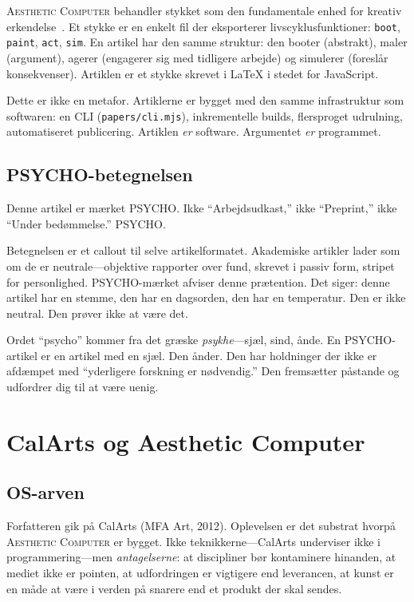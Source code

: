 \documentclass[10pt,letterpaper,twocolumn]{article}
\newcommand{\ac}{\textsc{Aesthetic Computer}}
\begin{document}
\ac{} behandler stykket som den fundamentale enhed for kreativ erkendelse~\citep{scudder2026pieces}. Et stykke er en enkelt fil der eksporterer livscyklusfunktioner: \texttt{boot}, \texttt{paint}, \texttt{act}, \texttt{sim}. En artikel har den samme struktur: den booter (abstrakt), maler (argument), agerer (engagerer sig med tidligere arbejde) og simulerer (foreslår konsekvenser). Artiklen er et stykke skrevet i \LaTeX{} i stedet for JavaScript.

Dette er ikke en metafor. Artiklerne er bygget med den samme infrastruktur som softwaren: en CLI (\texttt{papers/cli.mjs}), inkrementelle builds, flersproget udrulning, automatiseret publicering. Artiklen \emph{er} software. Argumentet \emph{er} programmet.

\subsection{PSYCHO-betegnelsen}

Denne artikel er mærket PSYCHO. Ikke ``Arbejdsudkast,'' ikke ``Preprint,'' ikke ``Under bedømmelse.'' PSYCHO.

Betegnelsen er et callout til selve artikelformatet. Akademiske artikler lader som om de er neutrale---objektive rapporter over fund, skrevet i passiv form, stripet for personlighed. PSYCHO-mærket afviser denne prætention. Det siger: denne artikel har en stemme, den har en dagsorden, den har en temperatur. Den er ikke neutral. Den prøver ikke at være det.

Ordet ``psycho'' kommer fra det græske \textit{psykhe}---sjæl, sind, ånde. En PSYCHO-artikel er en artikel med en sjæl. Den ånder. Den har holdninger der ikke er afdæmpet med ``yderligere forskning er nødvendig.'' Den fremsætter påstande og udfordrer dig til at være uenig.

\section{CalArts og Aesthetic Computer}

\subsection{OS-arven}

Forfatteren gik på CalArts (MFA Art, 2012). Oplevelsen er det substrat hvorpå \ac{} er bygget. Ikke teknikkerne---CalArts underviser ikke i programmering---men \emph{antagelserne}: at discipliner bør kontaminere hinanden, at mediet ikke er pointen, at udfordringen er vigtigere end leverancen, at kunst er en måde at være i verden på snarere end et produkt der skal sendes.
\end{document}

